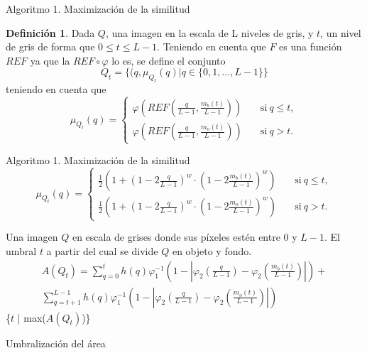 \documentclass{beamer}
\theoremstyle{plain} %
\theoremstyle{definition}
\newtheorem{defn}{Definición}
\newcommand{\abs}[1]{\left\vert#1\right\vert}
\begin{document}
\begin{frame}{Algoritmo 1. Maximización de la similitud}
\begin{defn}\label{def:conjuntodifusomonoumbral}
Dada $Q$, una imagen en la escala de L niveles de gris, y $t$, un nivel de gris de forma que $0\leq t\leq L-1$. Teniendo en cuenta que $F$ es una función $REF$ ya que la $REF \circ \varphi$ lo es, se define el conjunto
$$Q_t = \{(q, \mu_{Q_t}(q)|q\in \{0,1,\dots, L-1\}\}$$
teniendo en cuenta que
$$\mu_{Q_t}(q) = \left\{ \begin{aligned}
     \varphi\left(REF\left(\frac{q}{L-1}, \frac{m_b(t)}{L-1} \right)\right) & \quad\text{si}\ q\leq t,\\
     \varphi\left(REF\left(\frac{q}{L-1}, \frac{m_o(t)}{L-1} \right)\right) & \quad\text{si}\ q> t.
 \end{aligned}\right.$$
 \end{defn}
\end{frame}

\begin{frame}{Algoritmo 1. Maximización de la similitud}
  \begin{equation*} \label{eq:conjdifusosdombimono}
    \mu_{Q_t}(q) = \left\{ \begin{aligned}
         \frac{1}{2}\left(1 + \left(1-2\frac{q}{L-1}\right)^w\cdot\left(1-2\frac{m_b(t)}{L-1}\right)^w\right)& \quad\text{si}\ q\leq t,\\
         \frac{1}{2}\left(1 + \left(1-2\frac{q}{L-1}\right)^w\cdot\left(1-2\frac{m_o(t)}{L-1}\right)^w\right)& \quad\text{si}\ q> t.
     \end{aligned}\right.
\end{equation*}
\end{frame}

\begin{frame}[squeeze]
  \begin{algorithm}[H]%
  \begin{algorithmic}[1]
  \REQUIRE Una imagen $Q$ en escala de grises donde sus píxeles estén entre $0$ y $L-1$.
  \ENSURE El umbral $t$ a partir del cual se divide $Q$ en objeto y fondo.
  \STATE \begin{equation*}\begin{split}
  A(Q_t)= \sum_{q=0}^{t} h(q)\varphi_1^{-1}\left(1-\abs{\varphi_2\left(\frac{q}{L-1}\right)-\varphi_2\left(\frac{m_b(t)}{L-1}\right)}\right) + \\ \sum_{q=t+1}^{L-1} h(q)\varphi_1^{-1}\left(1-\abs{\varphi_2\left(\frac{q}{L-1}\right)-\varphi_2\left(\frac{m_o(t)}{L-1}\right)}\right)
  \end{split}\end{equation*}
  \ENDFOR
  \RETURN \{$t$ | max($A(Q_t)$)\}
  \end{algorithmic}
  \caption{Umbralización del área}\label{alg:algoritmo2}
  \end{algorithm}
\end{frame}
\end{document}
